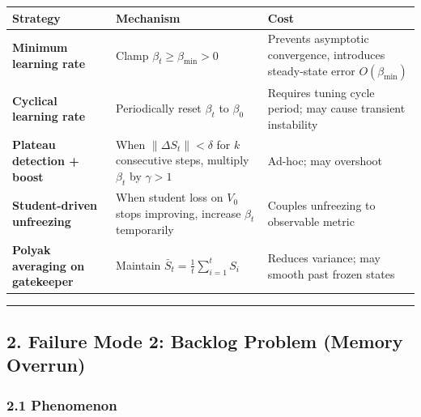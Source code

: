 \documentclass[
  12pt,
]{article}
\begin{document}
\begin{longtable}[]{@{}
  >{\raggedright\arraybackslash}p{}
  >{\raggedright\arraybackslash}p{}
  >{\raggedright\arraybackslash}p{}@{}}
\toprule\noalign{}
\begin{minipage}[b]{\linewidth}\raggedright
Strategy
\end{minipage} & \begin{minipage}[b]{\linewidth}\raggedright
Mechanism
\end{minipage} & \begin{minipage}[b]{\linewidth}\raggedright
Cost
\end{minipage} \\
\midrule\noalign{}
\endhead
\bottomrule\noalign{}
\endlastfoot
\textbf{Minimum learning rate} & Clamp \(\beta_t \geq \beta_{\min} > 0\)
& Prevents asymptotic convergence, introduces steady-state error
\(O(\beta_{\min})\) \\
\textbf{Cyclical learning rate} & Periodically reset \(\beta_t\) to
\(\beta_0\) & Requires tuning cycle period; may cause transient
instability \\
\textbf{Plateau detection + boost} & When \(\|\Delta S_t\| < \delta\)
for \(k\) consecutive steps, multiply \(\beta_t\) by \(\gamma > 1\) &
Ad-hoc; may overshoot \\
\textbf{Student-driven unfreezing} & When student loss on \(V_0\) stops
improving, increase \(\beta_t\) temporarily & Couples unfreezing to
observable metric \\
\textbf{Polyak averaging on gatekeeper} & Maintain
\(\bar{S}_t = \frac{1}{t}\sum_{i=1}^t S_i\) & Reduces variance; may
smooth past frozen states \\
\end{longtable}

\begin{center}\rule{0.5\linewidth}{0.5pt}\end{center}

\subsection{2. Failure Mode 2: Backlog Problem (Memory
Overrun)}\label{failure-mode-2-backlog-problem-memory-overrun}

\subsubsection{2.1 Phenomenon}\label{phenomenon-1}
\end{document}
